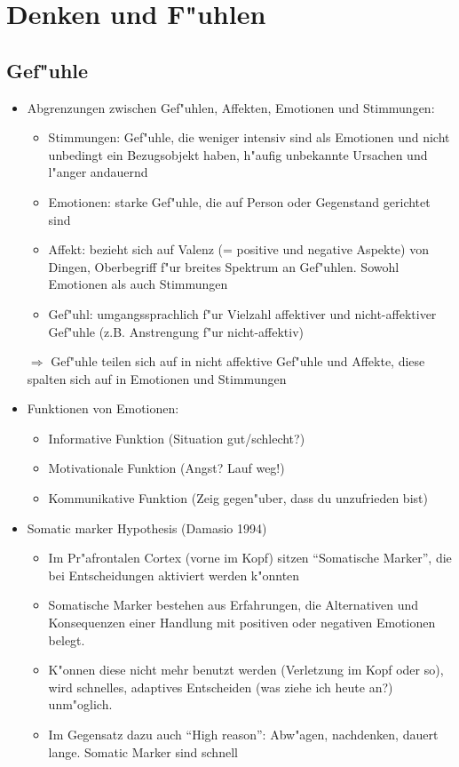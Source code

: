 \section{Denken und F"uhlen}
\subsection{Gef"uhle}
\begin{itemize}
	\item
		Abgrenzungen zwischen Gef"uhlen, Affekten, Emotionen und Stimmungen:
		\begin{itemize}
			\item
				Stimmungen: Gef"uhle, die weniger intensiv sind als Emotionen und nicht unbedingt ein Bezugsobjekt haben, h"aufig unbekannte Ursachen und l"anger andauernd
			\item
				Emotionen: starke Gef"uhle, die auf Person oder Gegenstand gerichtet sind
			\item
				Affekt: bezieht sich auf Valenz (= positive und negative Aspekte) von Dingen, Oberbegriff f"ur breites Spektrum an Gef"uhlen. Sowohl Emotionen als auch Stimmungen
			\item
				Gef"uhl: umgangssprachlich f"ur Vielzahl affektiver und nicht-affektiver Gef"uhle (z.B. Anstrengung f"ur nicht-affektiv)
		\end{itemize}
		$\Rightarrow$ Gef"uhle teilen sich auf in nicht affektive Gef"uhle und Affekte, diese spalten sich auf in Emotionen und Stimmungen

	\item
		Funktionen von Emotionen:
		\begin{itemize}
			\item
				Informative Funktion (Situation gut/schlecht?)
			\item
				Motivationale Funktion (Angst? Lauf weg!)
			\item
				Kommunikative Funktion (Zeig gegen"uber, dass du unzufrieden bist)
		\end{itemize}

	\item Somatic marker Hypothesis (Damasio 1994)
			\begin{itemize}
				\item
					Im Pr"afrontalen Cortex (vorne im Kopf) sitzen \enquote{Somatische Marker}, die bei Entscheidungen aktiviert werden k"onnten
				\item
					Somatische Marker bestehen aus Erfahrungen, die Alternativen und Konsequenzen einer Handlung mit positiven oder negativen Emotionen belegt.
				\item
					K"onnen diese nicht mehr benutzt werden (Verletzung im Kopf oder so), wird schnelles, adaptives Entscheiden (was ziehe ich heute an?) unm"oglich.
				\item
					Im Gegensatz dazu auch \enquote{High reason}: Abw"agen, nachdenken, dauert lange. Somatic Marker sind schnell
			\end{itemize}
\end{itemize}

